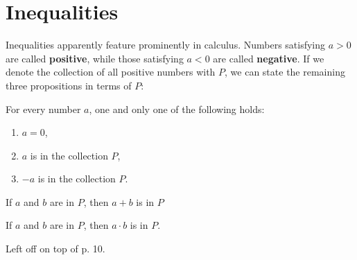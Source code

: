 \section{Inequalities}

Inequalities apparently feature prominently in calculus. Numbers satisfying $a > 0$ are
called \textbf{positive}, while those satisfying $a < 0$ are called \textbf{negative}. If
we denote the collection of all positive numbers with $P$, we can state the remaining
three propositions in terms of $P$:

\begin{property}\label{prop:trichotomy}
    For every number $a$, one and only one of the following holds:
    \begin{enumerate}[label=(\roman*), leftmargin = 3em]
        \item $a = 0$,
        \item $a$ is in the collection $P$,
        \item $-a$ is in the collection $P$.
    \end{enumerate}
\end{property}

\begin{property}\label{prop:addclosure}
    If $a$ and $b$ are in $P$, then $a + b$ is in $P$
\end{property}

\begin{property}\label{prop:multclosure}
    If $a$ and $b$ are in $P$, then $a \cdot b$ is in $P$.
\end{property}


Left off on top of p. 10.
